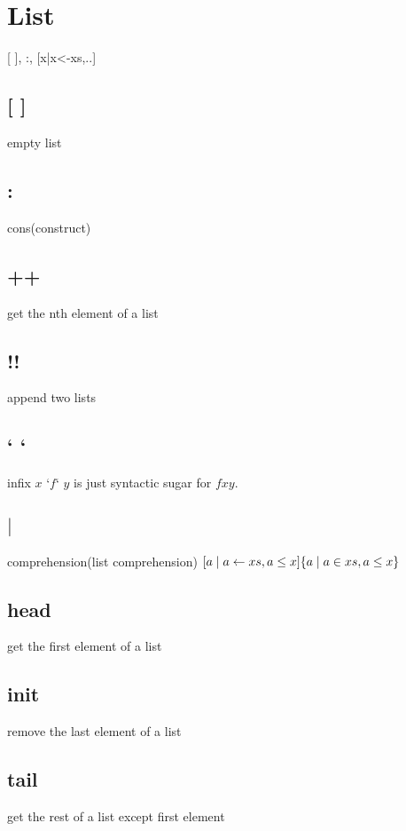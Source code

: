 \documentclass[a4paper,12pt]{article}
\theoremstyle{definition}
\begin{document}
\section{List} [ ], :, [x|x<-xs,..]

\subsection{[ ]} empty list 

\subsection{:} cons(construct)

\subsection{++} get the nth element of a list 

\subsection{!!}

append two lists

\subsection{` `}

infix 
$x$ `$f$` $y$ is just syntactic sugar for $f x y$. 

\subsection{$\mid$} comprehension(list comprehension) 
$[a \mid a \leftarrow xs, a \leq x] \\ \{ a \mid a \in xs, a \leq x\}$

\subsection{head} get the first element of a list

\subsection{init} remove the last element of a list

\subsection{tail} get the rest of a list except first element
\end{document}
